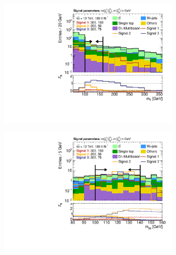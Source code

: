 \begin{figure}
\begin{subfigure}[b]{0.45\linewidth}
		\centering\includegraphics[width=\textwidth]{n1_SRLM_mct_bins/mt_both.pdf}
		\vspace{-2em}
		\caption{\label{fig:Wh_reopt_second_round_n1_srlm_mt}}
	\end{subfigure}%
	\begin{subfigure}[b]{0.45\linewidth}
		\centering\includegraphics[width=\textwidth]{n1_SRLM_mct_bins/mbb_both.pdf}
		\vspace{-2em}
		\caption{\label{fig:Wh_reopt_second_round_n1_srlm_mbb}}
	\end{subfigure}
	\par\medskip

\end{figure}

